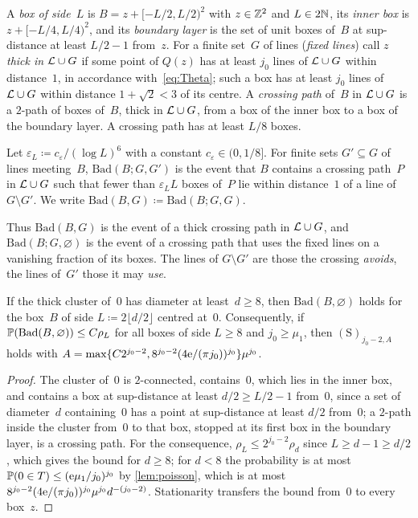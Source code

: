 \documentclass[11pt,letterpaper]{article}
\newcommand{\Bad}{\mathrm{Bad}}
\begin{document}
A \emph{box of side~$L$} is $B=z+[-L/2,L/2)^2$ with $z\in\mathbb Z^2$ and $L\in2\mathbb N$, its \emph{inner box} is $z+[-L/4,L/4)^2$, and its \emph{boundary layer} is the set of unit boxes of~$B$ at sup-distance at least $L/2-1$ from~$z$. For a finite set~$G$ of lines (\emph{fixed lines}) call $z$ \emph{thick in $\mathcal L\cup G$} if some point of $Q(z)$ has at least $j_0$ lines of $\mathcal L\cup G$ within distance~$1$, in accordance with~\eqref{eq:Theta}; such a box has at least $j_0$ lines of $\mathcal L\cup G$ within distance $1+\sqrt2<3$ of its centre. A \emph{crossing path} of~$B$ in $\mathcal L\cup G$ is a $2$-path of boxes of~$B$, thick in $\mathcal L\cup G$, from a box of the inner box to a box of the boundary layer. A crossing path has at least $L/8$ boxes.

\begin{definition}[The event $\Bad(B;G,G')$]
\label{def:bad}
Let $\varepsilon_L\coloneqq c_\varepsilon/(\log L)^6$ with a constant $c_\varepsilon\in(0,1/8]$. For finite sets $G'\subseteq G$ of lines meeting~$B$, $\Bad(B;G,G')$ is the event that $B$ contains a crossing path~$P$ in $\mathcal L\cup G$ such that fewer than $\varepsilon_LL$ boxes of~$P$ lie within distance~$1$ of a line of $G\setminus G'$. We write $\Bad(B,G)\coloneqq\Bad(B;G,G)$.
\end{definition}

Thus $\Bad(B,G)$ is the event of a thick crossing path in $\mathcal L\cup G$, and $\Bad(B;G,\varnothing)$ is the event of a crossing path that uses the fixed lines on a vanishing fraction of its boxes. The lines of $G\setminus G'$ are those the crossing \emph{avoids}, the lines of~$G'$ those it may \emph{use}.

\begin{lemma}
\label{lem:clustercrossing}
If the thick cluster of~$0$ has diameter at least~$d\ge8$, then $\Bad(B,\varnothing)$ holds for the box~$B$ of side $L\coloneqq2\lfloor d/2\rfloor$ centred at~$0$. Consequently, if $\P(\Bad(B,\varnothing))\le C\rho_L$ for all boxes of side $L\ge8$ and $j_0\ge\mu_1$, then $\mathrm{(S)}_{j_0-2,A}$ holds with $A=\max\{C2^{j_0-2},8^{j_0-2}(4\mathrm{e}/(\pi j_0))^{j_0}\}\mu^{j_0}$.
\end{lemma}

\begin{proof}
The cluster of~$0$ is $2$-connected, contains~$0$, which lies in the inner box, and contains a box at sup-distance at least $d/2\ge L/2-1$ from~$0$, since a set of diameter~$d$ containing~$0$ has a point at sup-distance at least $d/2$ from~$0$; a $2$-path inside the cluster from~$0$ to that box, stopped at its first box in the boundary layer, is a crossing path. For the consequence, $\rho_L\le2^{j_0-2}\rho_d$ since $L\ge d-1\ge d/2$, which gives the bound for $d\ge8$; for $d<8$ the probability is at most $\mathbb P(0\in T)\le(\mathrm{e}\mu_1/j_0)^{j_0}$ by \cref{lem:poisson}, which is at most $8^{j_0-2}(4\mathrm{e}/(\pi j_0))^{j_0}\mu^{j_0}d^{-(j_0-2)}$. Stationarity transfers the bound from~$0$ to every box~$z$.
\end{proof}
\end{document}

